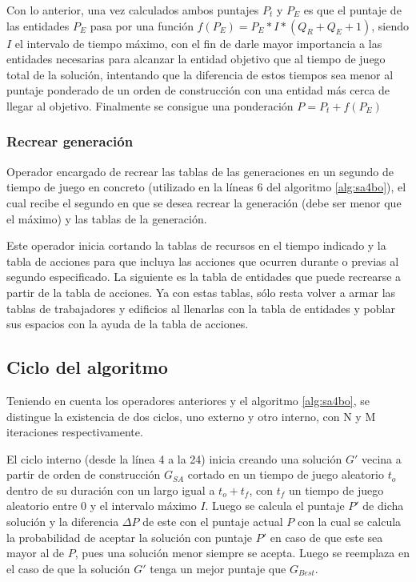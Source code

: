 Con lo anterior, una vez calculados ambos puntajes $P_t$ y $P_E$ es que el puntaje de las entidades $P_E$ pasa por una función $f(P_E) = P_E * I * (Q_R + Q_E + 1)$, siendo $I$ el intervalo de tiempo máximo, con el fin de darle mayor importancia a las entidades necesarias para alcanzar la entidad objetivo que al tiempo de juego total de la solución, intentando que la diferencia de estos tiempos sea menor al puntaje ponderado de un orden de construcción con una entidad más cerca de llegar al objetivo. Finalmente se consigue una ponderación $P = P_t + f(P_E) $

\subsubsection{Recrear generación}

Operador encargado de recrear las tablas de las generaciones en un segundo de tiempo de juego en concreto (utilizado en la líneas 6 del algoritmo \ref{alg:sa4bo}), el cual recibe el segundo en que se desea recrear la generación (debe ser menor que el máximo) y las tablas de la generación.

Este operador inicia cortando la tablas de recursos en el tiempo indicado y la tabla de acciones para que incluya las acciones que ocurren durante o previas al segundo especificado. La siguiente es la tabla de entidades que puede recrearse a partir de la tabla de acciones. Ya con estas tablas, sólo resta volver a armar las tablas de trabajadores y edificios al llenarlas con la tabla de entidades y poblar sus espacios con la ayuda de la tabla de acciones.

\subsection{Ciclo del algoritmo}

Teniendo en cuenta los operadores anteriores y el algoritmo \ref{alg:sa4bo}, se distingue la existencia de dos ciclos, uno externo y otro interno, con N y M iteraciones respectivamente.

El ciclo interno (desde la línea 4 a la 24) inicia creando una solución $G'$ vecina a partir de orden de construcción $G_{SA}$ cortado en un tiempo de juego aleatorio $t_o$ dentro de su duración con un largo igual a $t_o + t_f$, con $t_f$ un tiempo de juego aleatorio entre 0 y el intervalo máximo $I$. Luego se calcula el puntaje $P'$ de dicha solución y la diferencia $\Delta P$ de este con el puntaje actual $P$ con la cual se calcula la probabilidad de aceptar la solución con puntaje $P'$ en caso de que este sea mayor al de $P$, pues una solución menor siempre se acepta. Luego se reemplaza en el caso de que la solución $G'$ tenga un mejor puntaje que $G_{Best}$.

